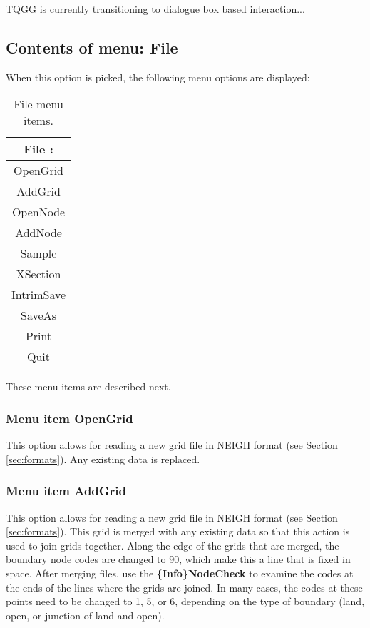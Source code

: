\documentclass{article}
\begin{document}
TQGG is currently transitioning to dialogue box based interaction... 

\subsection{Contents of menu: File}
When this option is picked, the following menu options are displayed:

\begin{table}[htb!]
 \caption{File menu items.}
  \begin{center}
   \begin{tabular}{|c|}
    \hline
File :\\     \hline
OpenGrid \\ AddGrid \\     \hline
OpenNode \\ AddNode \\    \hline
Sample \\    \hline
XSection \\    \hline
IntrimSave \\ SaveAs \\    \hline
Print \\ Quit\\
    \hline
   \end{tabular}
   \label{tab:FILE}
  \end{center}
\end{table}

These menu items are described next.

\subsubsection[Menu item OpenGrid]{Menu item OpenGrid}
This option allows for reading a new grid file in NEIGH format (see Section \ref{sec:formats}). Any existing data is replaced.

\subsubsection[Menu item AddGrid]{Menu item AddGrid}
This option allows for reading a new grid file in NEIGH format (see Section \ref{sec:formats}). This grid is merged with any existing data so that this action is used to join grids together. Along the edge of the grids that are merged, the boundary node codes are changed to 90, which make this a line that is fixed in space. After merging files, use the \textbf{\{Info\}NodeCheck} to examine the codes at the ends of the lines where the grids are joined. In many cases, the codes at these points need to be changed to 1, 5, or 6, depending on the type of boundary (land, open, or junction of land and open).
\end{document}
